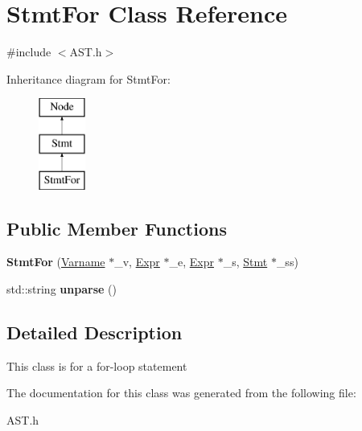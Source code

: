 \hypertarget{classStmtFor}{\section{Stmt\-For Class Reference}
\label{classStmtFor}
}


{\ttfamily \#include $<$A\-S\-T.\-h$>$}

Inheritance diagram for Stmt\-For\-:\begin{figure}[H]
\begin{center}
\leavevmode
\includegraphics[height=3.000000cm]{classStmtFor}
\end{center}
\end{figure}
\subsection*{Public Member Functions}
\begin{DoxyCompactItemize}
\item 
\hypertarget{classStmtFor_adf16f36352035a80f470b9b655fc2c91}{{\bfseries Stmt\-For} (\hyperlink{classVarname}{Varname} $\ast$\-\_\-v, \hyperlink{classExpr}{Expr} $\ast$\-\_\-e, \hyperlink{classExpr}{Expr} $\ast$\-\_\-s, \hyperlink{classStmt}{Stmt} $\ast$\-\_\-ss)}\label{classStmtFor_adf16f36352035a80f470b9b655fc2c91}

\item 
\hypertarget{classStmtFor_a91c8475d4d4628fed8926ffc22425b95}{std\-::string {\bfseries unparse} ()}\label{classStmtFor_a91c8475d4d4628fed8926ffc22425b95}

\end{DoxyCompactItemize}


\subsection{Detailed Description}
This class is for a for-\/loop statement 

The documentation for this class was generated from the following file\-:\begin{DoxyCompactItemize}
\item 
A\-S\-T.\-h\end{DoxyCompactItemize}
